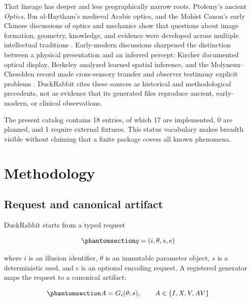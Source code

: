 \documentclass[
  english,
]{article}
\begin{document}
That lineage has deeper and less geographically narrow roots. Ptolemy's
ancient \emph{Optics}, Ibn al-Haytham's medieval Arabic optics, and the
Mohist Canon's early Chinese discussions of optics and mechanics show
that questions about image formation, geometry, knowledge, and evidence
were developed across multiple intellectual traditions
\citep{ptolemy1996optics, alhazen1989optics, mozi2023canons, dai2015chinesescience}.
Early-modern discussions sharpened the distinction between a physical
presentation and an inferred percept: Kircher documented optical
display, Berkeley analyzed learned spatial inference, and the
Molyneux--Cheselden record made cross-sensory transfer and observer
testimony explicit problems
\citep{kircher1646light, berkeley1709vision, molyneux2020problem, cheselden1728sight}.
DuckRabbit cites these sources as historical and methodological
precedents, not as evidence that its generated files reproduce ancient,
early-modern, or clinical observations.

The present catalog contains 18 entries, of which 17 are implemented, 0
are planned, and 1 require external fixtures. This status vocabulary
makes breadth visible without claiming that a finite package covers all
known phenomena.

\newpage

\section{Methodology}\label{sec:methodology}

\subsection{Request and canonical
artifact}\label{request-and-canonical-artifact}

DuckRabbit starts from a typed request

\begin{equation}\protect\phantomsection\label{eq:typed_request}{
q = (i, \theta, s, e)
}\end{equation}

where \(i\) is an illusion identifier, \(\theta\) is an immutable
parameter object, \(s\) is a deterministic seed, and \(e\) is an
optional encoding request. A registered generator maps the request to a
canonical artifact:

\begin{equation}\protect\phantomsection\label{eq:canonical_generation}{
A = G_i(\theta; s), \qquad A \in \{I, X, V, AV\}
}\end{equation}
\end{document}
